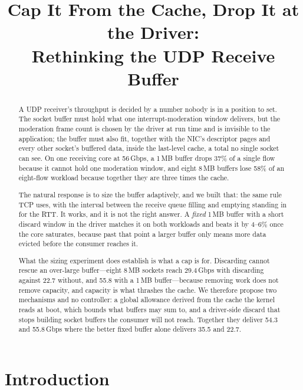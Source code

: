 \documentclass[letterpaper,twocolumn,10pt]{article}
\begin{document}
\title{\Large \bf Cap It From the Cache, Drop It at the Driver:\\
Rethinking the UDP Receive Buffer}

\author{}
\date{}
\maketitle

\begin{abstract}
A UDP receiver's throughput is decided by a number nobody is in a position to
set. The socket buffer must hold what one interrupt-moderation window delivers,
but the moderation frame count is chosen by the driver at run time and is
invisible to the application; the buffer must also fit, together with the NIC's
descriptor pages and every other socket's buffered data, inside the last-level
cache, a total no single socket can see. On one receiving core at 56\,Gbps, a
1\,MB buffer drops 37\% of a single flow because it cannot hold one moderation
window, and eight 8\,MB buffers lose 58\% of an eight-flow workload because
together they are three times the cache.

The natural response is to size the buffer adaptively, and we built that: the
same rule TCP uses, with the interval between the receive queue filling and
emptying standing in for the RTT. It works, and it is not the right answer. A
\emph{fixed} 1\,MB buffer with a short discard window in the driver matches it
on both workloads and beats it by 4--6\% once the core saturates, because past
that point a larger buffer only means more data evicted before the consumer
reaches it.

What the sizing experiment does establish is what a cap is for. Discarding
cannot rescue an over-large buffer---eight 8\,MB sockets reach 29.4\,Gbps with
discarding against 22.7 without, and 55.8 with a 1\,MB buffer---because removing
work does not remove capacity, and capacity is what thrashes the cache. We
therefore propose two mechanisms and no controller: a global allowance derived
from the cache the kernel reads at boot, which bounds what buffers may sum to,
and a driver-side discard that stops building socket buffers the consumer will
not reach. Together they deliver 54.3 and 55.8\,Gbps where the better fixed
buffer alone delivers 35.5 and 22.7.
\end{abstract}

\section{Introduction}
\end{document}
